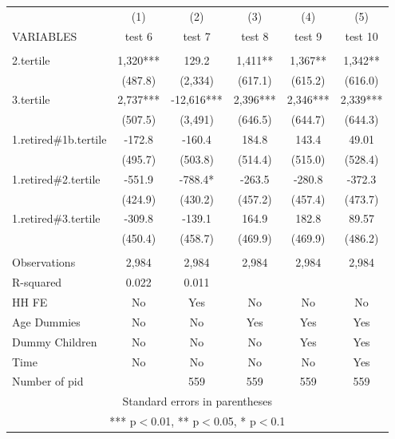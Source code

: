 \begin{tabular}{lccccc} \hline
 & (1) & (2) & (3) & (4) & (5) \\
VARIABLES & test 6 & test 7 & test 8 & test 9 & test 10 \\ \hline
 &  &  &  &  &  \\
2.tertile & 1,320*** & 129.2 & 1,411** & 1,367** & 1,342** \\
 & (487.8) & (2,334) & (617.1) & (615.2) & (616.0) \\
3.tertile & 2,737*** & -12,616*** & 2,396*** & 2,346*** & 2,339*** \\
 & (507.5) & (3,491) & (646.5) & (644.7) & (644.3) \\
1.retired\#1b.tertile & -172.8 & -160.4 & 184.8 & 143.4 & 49.01 \\
 & (495.7) & (503.8) & (514.4) & (515.0) & (528.4) \\
1.retired\#2.tertile & -551.9 & -788.4* & -263.5 & -280.8 & -372.3 \\
 & (424.9) & (430.2) & (457.2) & (457.4) & (473.7) \\
1.retired\#3.tertile & -309.8 & -139.1 & 164.9 & 182.8 & 89.57 \\
 & (450.4) & (458.7) & (469.9) & (469.9) & (486.2) \\
 &  &  &  &  &  \\
Observations & 2,984 & 2,984 & 2,984 & 2,984 & 2,984 \\
R-squared & 0.022 & 0.011 &  &  &  \\
HH FE & No & Yes & No & No & No \\
Age Dummies & No & No & Yes & Yes & Yes \\
Dummy Children & No & No & No & Yes & Yes \\
Time & No & No & No & No & Yes \\
 Number of pid &  & 559 & 559 & 559 & 559 \\ \hline
\multicolumn{6}{c}{ Standard errors in parentheses} \\
\multicolumn{6}{c}{ *** p$<$0.01, ** p$<$0.05, * p$<$0.1} \\
\end{tabular}
